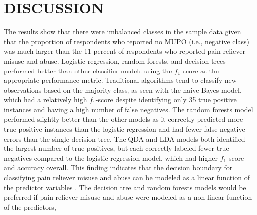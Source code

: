 \documentclass[sigconf]{acmart}
\begin{document}

\section{DISCUSSION}

The results show that there were imbalanced classes in the sample data given 
that the proportion of respondents who reported no MUPO (i.e., negative class)
was much larger than the 11 percent of respondents who reported pain reliever 
misuse and abuse. Logistic regression, random forests, and decision trees
performed better than other classifier models using the $f_1$-score as the 
appropriate performance metric. Traditional algorithms tend to classify new 
observations based on the majority class, as seen with the naive Bayes model, 
which had a relatively high $f_1$-score despite identifying only 35 true 
positive instances and having a high number of false negatives. The random 
forests model performed slightly better than the other models as it correctly 
predicted more true positive instances than the logistic regression and had 
fewer false negative errors than the single decision tree. The QDA and LDA 
models both identified the largest number of true positives, but each correctly 
labeled fewer true negatives compared to the logistic regression model, which 
had higher $f_1$-score and accuracy overall. This finding indicates that the 
decision boundary for classifying pain reliever misuse and abuse can be modeled 
as a linear function of the predictor variables \cite{james13, raschka17}. 
The decision tree and random forests models would be preferred if pain reliever 
misuse and abuse were modeled as a non-linear function of the predictors,

\end{document}
